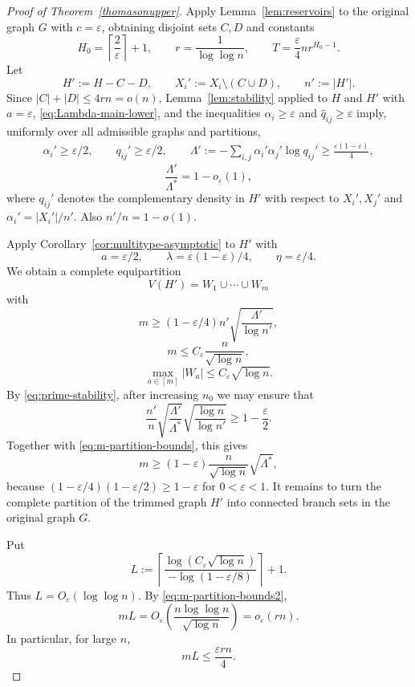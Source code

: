 \documentclass{article}
\newcommand{\eps}{\varepsilon}
\begin{document}
\begin{proof}[Proof of Theorem~\ref{thomasonupper}]
Apply Lemma~\ref{lem:reservoirs} to the original graph $G$ with $c=\eps$, obtaining disjoint sets $C,D$ and constants
\[
 H_0=\left\lceil\frac2\eps\right\rceil+1,
 \qquad
 r=\frac1{\log\log n},
 \qquad
 T=\frac\eps4nr^{H_0-1}.
\]
Let
\[
 H':=H-C-D,
 \qquad
 X_i':=X_i\setminus(C\cup D),
 \qquad
 n':=|H'|.
\]
Since $|C|+|D|\le4rn=o(n)$, Lemma~\ref{lem:stability} applied to $H$ and $H'$ with $a=\eps$, \eqref{eq:Lambda-main-lower}, and the inequalities $\alpha_i\ge\eps$ and $\widehat q_{ij}\ge\eps$ imply, uniformly over all admissible graphs and partitions,
\[
\begin{aligned}
 \alpha_i'\ge\eps/2,
 \qquad
 q_{ij}'\ge\eps/2,
 \qquad
 \Lambda':=-\sum_{i,j}\alpha_i'\alpha_j'\log q_{ij}'\ge\frac{\eps(1-\eps)}4,
\end{aligned}
\]
\begin{equation}\label{eq:prime-stability}
\frac{\Lambda'}{\Lambda^*}=1-o_{\eps}(1),
\end{equation}
where $q_{ij}'$ denotes the complementary density in $H'$ with respect to $X_i',X_j'$ and $\alpha_i'=|X_i'|/n'$.  Also $n'/n=1-o(1)$.

Apply Corollary~\ref{cor:multitype-asymptotic} to $H'$ with
\[
 a=\eps/2,
 \qquad
 \lambda=\eps(1-\eps)/4,
 \qquad
 \eta=\eps/4.
\]
We obtain a complete equipartition
\[
 V(H')=W_1\cup\cdots\cup W_m
\]
with
\begin{equation}\label{eq:m-partition-bounds}
 m\ge(1-\eps/4)n'\sqrt{\frac{\Lambda'}{\log n'}},
\end{equation}
\begin{equation}\label{eq:m-partition-bounds2}
 m\le C_\eps\frac n{\sqrt{\log n}},
\end{equation}
\begin{equation}\label{eq:m-partition-bounds3}
 \max_{a \in [m]} |W_a|\le C_\eps\sqrt{\log n}.
\end{equation}
By \eqref{eq:prime-stability}, after increasing $n_0$ we may ensure that
\[
 \frac{n'}n
 \sqrt{\frac{\Lambda'}{\Lambda^*}}
 \sqrt{\frac{\log n}{\log n'}}
 \ge1-\frac\eps2.
\]
Together with \eqref{eq:m-partition-bounds}, this gives
\begin{equation}\label{eq:m-target}
 m\ge(1-\eps)\frac n{\sqrt{\log n}}\sqrt{\Lambda^*},
\end{equation}
because $(1-\eps/4)(1-\eps/2)\ge1-\eps$ for $0<\eps<1$.
It remains to turn the complete partition of the trimmed graph $H'$ into connected branch sets in the original graph $G$.

Put
\begin{equation}\label{eq:L-def}
 L:=\left\lceil
 \frac{\log(C_\eps\sqrt{\log n})}{-\log(1-\eps/8)}
 \right\rceil+1.
\end{equation}
Thus $L=O_\eps(\log\log n)$.  By \eqref{eq:m-partition-bounds2},
\begin{equation}\label{eq:ML-small}
 mL=O_\eps\left(\frac{n\log\log n}{\sqrt{\log n}}\right)=o_\eps(rn).
\end{equation}
In particular, for large $n$,
\begin{equation}\label{eq:ML-less-D}
 mL\le\frac{\eps rn}{4}.
\end{equation}


\end{proof}
\end{document}
